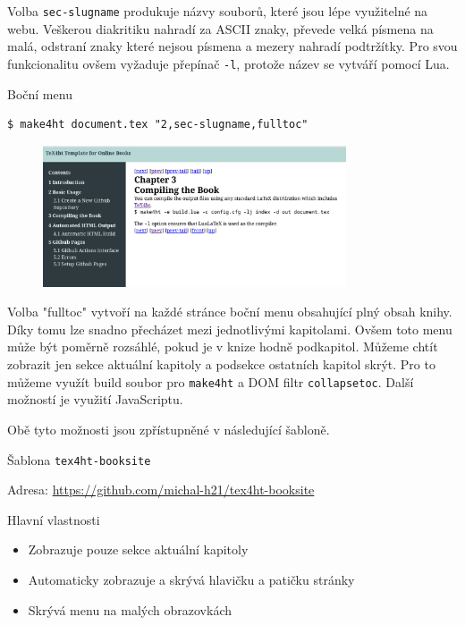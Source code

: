 Volba \verb|sec-slugname| produkuje názvy souborů, které jsou lépe využitelné
na webu. Veškerou diakritiku nahradí za ASCII znaky, převede velká písmena na
malá, odstraní znaky které nejsou písmena a mezery nahradí podtržítky. Pro svou
funkcionalitu ovšem vyžaduje přepínač \verb|-l|, protože název se vytváří
pomocí Lua.

\begin{frame}[fragile]{Boční menu}

\begin{block}{}
\begin{verbatim}
$ make4ht document.tex "2,sec-slugname,fulltoc"
\end{verbatim}
\end{block}

\begin{figure}
\includegraphics[width=0.8\textwidth]{img/fulltoc-basic.png}
\end{figure}

\end{frame}

Volba "fulltoc" vytvoří na každé stránce boční menu obsahující plný obsah knihy. 
Díky tomu lze snadno přecházet mezi jednotlivými kapitolami. Ovšem toto menu 
může být poměrně rozsáhlé, pokud je v knize hodně podkapitol. Můžeme chtít 
zobrazit jen sekce aktuální kapitoly a podsekce ostatních kapitol skrýt. 
Pro to můžeme využít build soubor pro \texttt{make4ht} a DOM filtr 
\texttt{collapsetoc}. Další možností je využití JavaScriptu.

Obě tyto možnosti jsou zpřístupněné v následující šabloně.

\begin{frame}[fragile]{Šablona \texttt{tex4ht-booksite}}

\begin{block}{Adresa:}
\url{https://github.com/michal-h21/tex4ht-booksite}
\end{block}

\begin{block}{Hlavní vlastnosti}
  \begin{itemize}
    \item Zobrazuje pouze sekce aktuální kapitoly
    \item Automaticky zobrazuje a skrývá hlavičku a patičku stránky
    \item Skrývá menu na malých obrazovkách
  \end{itemize}
\end{block}

\end{frame}

